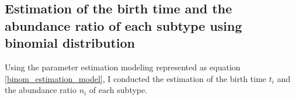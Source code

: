 \documentclass{article}
\begin{document}
\subsection{Estimation of the birth time and the abundance ratio of each subtype using binomial distribution}
Using the parameter estimation modeling represented as equation \ref{binom_estimation_model}, I conducted the estimation of the birth time $t_i$ and the abundance ratio $n_i$ of each subtype.



\end{document}
